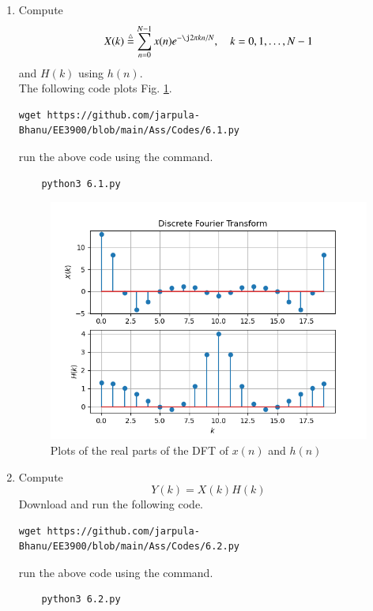 \documentclass[journal,12pt,twocolumn]{IEEEtran}
\renewcommand\thesection{\arabic{section}}
\begin{document}
\begin{enumerate}[label=\thesection.\arabic*
,ref=\thesection.\theenumi]
\item
Compute
\begin{equation}
X(k) \define \sum _{n=0}^{N-1}x(n) e^{-\j2\pi kn/N}, \quad k = 0,1,\dots, N-1
\end{equation}
and $H(k)$ using $h(n)$.\\
\solution The following code plots Fig. \ref{fig:6.1}.
%
\begin{lstlisting}
wget https://github.com/jarpula-Bhanu/EE3900/blob/main/Ass/Codes/6.1.py
\end{lstlisting}
run the above code using the command.
\begin{lstlisting}
	python3 6.1.py
\end{lstlisting}
\begin{figure}[!ht]
\centering
\includegraphics[width=\columnwidth]{./figs/6.1.png}
\caption{Plots of the real parts of the DFT of $x(n)$ and $h(n)$}
\label{fig:6.1}
\end{figure}

\item Compute 
\begin{equation}\label{6.2}
Y(k) = X(k)H(k)
\end{equation}
\solution Download and run the following code.
%
\begin{lstlisting}
wget https://github.com/jarpula-Bhanu/EE3900/blob/main/Ass/Codes/6.2.py
\end{lstlisting}
run the above code using the command.
\begin{lstlisting}
	python3 6.2.py
\end{lstlisting}


\end{enumerate}
\end{document}
